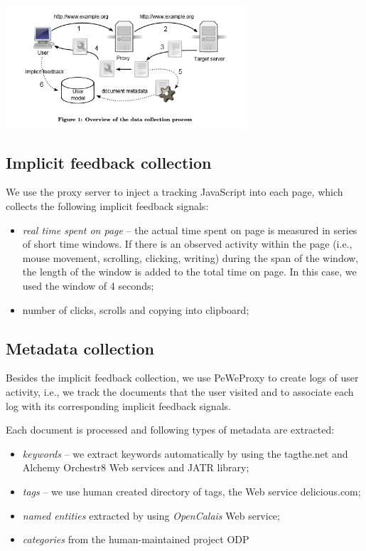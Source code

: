 \documentclass{acm_proc_article-sp} %
\begin{document}
\begin{center}
\includegraphics[width=90mm]{DataCol.png}

\end{center}



\subsection{Implicit feedback collection}

We use the proxy server to inject a tracking JavaScript into
each page, which collects the following implicit feedback signals:

\begin{itemize} 
	\item \textit{real time spent on page} – the actual time spent on page
	is measured in series of short time windows. If there
	is an observed activity within the page (i.e., mouse
	movement, scrolling, clicking, writing) during the span
	of the window, the length of the window is added to the
	total time on page. In this case, we used the window
	of 4 seconds;
	\item number of clicks, scrolls and copying into clipboard;
\end{itemize}

\subsection{Metadata collection}

Besides the implicit feedback collection, we use PeWeProxy
to create logs of user activity, i.e., we track the documents
that the user visited and to associate each log with its corresponding
implicit feedback signals.

Each document is processed and following types of metadata
are extracted:

\begin{itemize} 
	\item \textit{keywords} – we extract keywords automatically by using
	the tagthe.net and Alchemy Orchestr8 Web services
	and JATR library;
	\item \textit{tags} – we use human created directory of tags, the Web
		service delicious.com;
	\item \textit{named entities} extracted by using \textit{OpenCalais} Web
		service;
	\item \textit{categories} from the human-maintained project ODP
\end{itemize}
\end{document}

